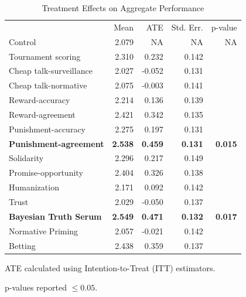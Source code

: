 \documentclass{chi2009}
\begin{document}
\begin{table}[ht]					%
\begin{center}						%
\caption{Treatment Effects on Aggregate Performance} %
\vspace{8pt}
\begin{threeparttable}
\begin{tabular}{@{}l r r r r@{}}
\toprule
& Mean & ATE\tnote{\dag} & Std. Err. & p-value\tnote{\ddag}\\
\cmidrule(l){2-5}
Control & 2.079 & NA & NA & NA\\
Tournament scoring & 2.310 & 0.232 & 0.142 &\\
Cheap talk-surveillance& 2.027 & -0.052 & 0.131 &\\
Cheap talk-normative& 2.075 & -0.003 & 0.141 &\\
Reward-accuracy& 2.214 & 0.136 & 0.139 &\\
Reward-agreement& 2.421 & 0.342 & 0.135 &\\
Punishment-accuracy& 2.275 & 0.197 & 0.131 & \\
\textbf{Punishment-agreement} & \textbf{2.538} & \textbf{0.459} & \textbf{0.131} & \textbf{0.015}\\
Solidarity& 2.296 & 0.217 & 0.149 &\\
Promise-opportunity& 2.404 & 0.326 & 0.138 &\\
Humanization& 2.171 & 0.092 & 0.142 &\\
Trust& 2.029 & -0.050 & 0.137 &\\
\textbf{Bayesian Truth Serum} & \textbf{2.549} & \textbf{0.471} & \textbf{0.132} & \textbf{0.017}\\
Normative Priming& 2.057 & -0.021 & 0.142 &\\
Betting& 2.438 & 0.359 & 0.137 &\\ 
  \bottomrule
\end{tabular}
  \begin{tablenotes}[para]
     \item[\dag]ATE calculated using Intention-to-Treat (ITT) estimators.\\
     \item[\ddag]p-values reported $\leq 0.05$.
  \end{tablenotes}
\end{threeparttable}
\label{table:agg_results_ITT}
\end{center}
\end{table}
\end{document}
